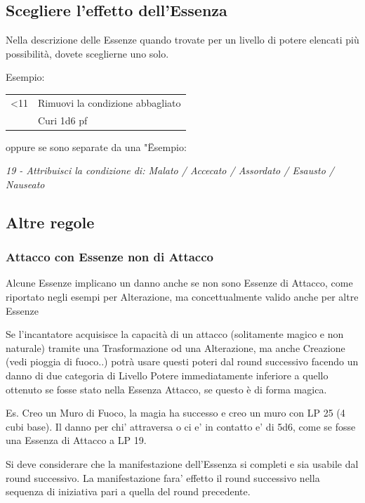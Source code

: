 \documentclass[a4paper,11pt,twoside,openany]{book}
\begin{document}
\subsection{Scegliere l'effetto dell'Essenza}

\label{scegliere-leffetto-dellessenza}

Nella descrizione delle Essenze quando trovate per un livello di potere elencati più possibilità, dovete sceglierne uno solo.

Esempio:

\medskip

\begin{tabularx}{\textwidth}{lX}
	\toprule
	<11 & Rimuovi la condizione abbagliato\tabularnewline
	    & Curi 1d6 pf
\end{tabularx}

oppure se sono separate da una "\" 
Esempio:

\textit{19 - Attribuisci la condizione di: Malato / Accecato / Assordato / Esausto / Nauseato}

\subsection{Altre regole}

\label{altre-regole}

\subsubsection{Attacco con Essenze non di Attacco}

Alcune Essenze implicano un danno anche se non sono Essenze di Attacco, come riportato negli esempi per Alterazione, ma concettualmente valido anche per altre Essenze

Se l'incantatore acquisisce la capacità di un attacco (solitamente magico e non naturale) tramite una Trasformazione od una Alterazione, ma anche Creazione (vedi pioggia di fuoco..) potrà usare questi poteri dal round successivo facendo un danno di due categoria di Livello Potere immediatamente inferiore a quello ottenuto se fosse stato nella Essenza Attacco, se questo è di forma magica.

Es. Creo un Muro di Fuoco, la magia ha successo e creo un muro con LP 25 (4 cubi base). Il danno per chi' attraversa o ci e' in contatto e' di 5d6, come se fosse una Essenza di Attacco a LP 19.

Si deve considerare che la manifestazione dell'Essenza si completi e sia usabile dal round successivo. La manifestazione fara' effetto il round successivo nella sequenza di iniziativa pari a quella del round precedente.
\end{document}
